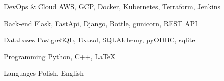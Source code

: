 

\begin{cvskills}

  \cvskill
    {DevOps \& Cloud} %
    {AWS, GCP, Docker, Kubernetes, Terraform, Jenkins} %

  \cvskill
    {Back-end} %
    {Flask, FastApi, Django, Bottle, gunicorn, REST API} %

  \cvskill
    {Databases} %
    {PostgreSQL, Exasol, SQLAlchemy, pyODBC, sqlite} %

  \cvskill
    {Programming} %
    {Python, C++, LaTeX} %

  \cvskill
    {Languages} %
    {Polish, English} %

\end{cvskills}
